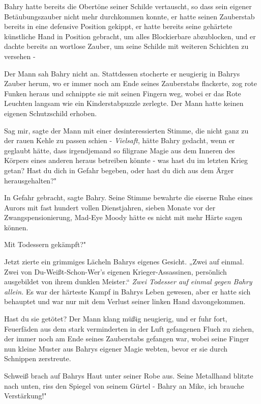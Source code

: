 Bahry hatte bereits die Obertöne seiner Schilde vertauscht, so dass sein eigener
Betäubungszauber nicht mehr durchkommen konnte, er hatte seinen Zauberstab
bereits in eine defensive Position gekippt, er hatte bereits seine gehärtete
künstliche Hand in Position gebracht, um alles Blockierbare abzublocken, und er
dachte bereits an wortlose Zauber, um seine Schilde mit weiteren Schichten zu
versehen -

Der Mann sah Bahry nicht an. Stattdessen stocherte er neugierig in Bahrys Zauber
herum, wo er immer noch am Ende seines Zauberstabs flackerte, zog rote Funken
heraus und schnippte sie mit seinen Fingern weg, wobei er das Rote Leuchten
langsam wie ein Kinderstabpuzzle zerlegte. Der Mann hatte keinen eigenen
Schutzschild erhoben.

\glqq{}Sag mir\grqq{}, sagte der Mann mit einer desinteressierten Stimme, die
nicht ganz zu der rauen Kehle zu passen schien - \emph{Vielsaft}, hätte Bahry
gedacht, wenn er geglaubt hätte, dass irgendjemand so filigrane Magie aus dem
Inneren des Körpers eines anderen heraus betreiben könnte - \glqq{}was hast du im
letzten Krieg getan? Hast du dich in Gefahr begeben, oder hast du dich aus dem
Ärger herausgehalten?"

\glqq{}In Gefahr gebracht\grqq{}, sagte Bahry. Seine Stimme bewahrte die eiserne
Ruhe eines Aurors mit fast hundert vollen Dienstjahren, sieben Monate vor der
Zwangspensionierung, Mad-Eye Moody hätte es nicht mit mehr Härte sagen können.

\glqq{}Mit Todessern gekämpft?"

Jetzt zierte ein grimmiges Lächeln Bahrys eigenes Gesicht. „Zwei auf einmal.
Zwei von Du-Weißt-Schon-Wer's eigenen Krieger-Assassinen, persönlich ausgebildet
von ihrem dunklen Meister.“
\emph{Zwei Todesser auf einmal gegen Bahry allein.}
Es war der härteste Kampf in Bahrys Leben gewesen, aber er hatte sich behauptet
und war nur mit dem Verlust seiner linken Hand davongekommen.

\glqq{}Hast du sie getötet?\grqq{} Der Mann klang müßig neugierig, und er fuhr
fort, Feuerfäden aus dem stark verminderten in der Luft gefangenen Fluch zu
ziehen, der immer noch am Ende seines Zauberstabs gefangen war, wobei seine
Finger nun kleine Muster aus Bahrys eigener Magie webten, bevor er sie durch
Schnippen zerstreute.

Schweiß brach auf Bahrys Haut unter seiner Robe aus. Seine Metallhand blitzte
nach unten, riss den Spiegel von seinem Gürtel - \glqq{}Bahry an Mike, ich
brauche Verstärkung!"

